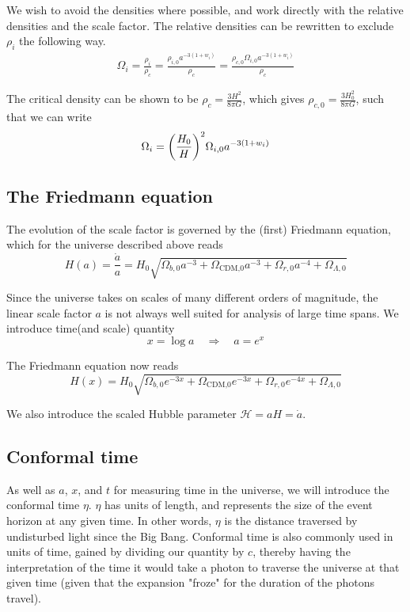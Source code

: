\documentclass[10pt, a4paper]{article}
\renewcommand{\exp}{e^}
\renewcommand{\exp}{e^}
\begin{document}
We wish to avoid the densities where possible, and work directly with the relative densities and the scale factor. The relative densities can be rewritten to exclude $\rho_i$ the following way.
\begin{align*}
    \Omega_{i} = \frac{\rho_i}{\rho_c} = \frac{\rho_{i,0}a^{-3(1+w_i)}}{\rho_c} = \frac{\rho_{c,0}\Omega_{i,0}a^{-3(1+w_i)}}{\rho_c}
\end{align*}

The critical density can be shown \cite{callin2006} to be $\rho_c = \frac{3H^2}{8\pi G}$, which gives $\rho_{c,0} = \frac{3H_0^2}{8\pi G}$, such that we can write
\begin{align}\label{eqn:Omegas}
    \Omega_{i} = \qty(\frac{H_0}{H})^2\Omega_{i,0}a^{-3(1+w_i)}
\end{align}


\subsection{The Friedmann equation}
The evolution of the scale factor is governed by the (first) Friedmann equation, which for the universe described above reads \cite{callin2006}
\begin{equation}
    H(a) = \frac{\dot{a}}{a} = H_0\sqrt{\Omega_{b,0} a^{-3} + \Omega_\text{{CDM},0}a^{-3} + \Omega_{r,0}a^{-4} + \Omega_{\Lambda,0}}
\end{equation}

Since the universe takes on scales of many different orders of magnitude, the linear scale factor $a$ is not always well suited for analysis of large time spans. We introduce time(and scale) quantity
\begin{equation}
    x = \log{a} \quad \Rightarrow \quad a = \exp{x}
\end{equation}

The Friedmann equation now reads
\begin{equation} \label{eqn:Friedmann}
    H(x) = H_0\sqrt{\Omega_{b,0} e^{-3x} + \Omega_\text{{CDM},0}e^{-3x} + \Omega_{r,0}e^{-4x} + \Omega_{\Lambda,0}}
\end{equation}

We also introduce the scaled Hubble parameter $\mathcal{H} = aH = \dot{a}$.


\subsection{Conformal time}
As well as $a$, $x$, and $t$ for measuring time in the universe, we will introduce the conformal time $\eta$. $\eta$ has units of length, and represents the size of the event horizon at any given time. In other words, $\eta$ is the distance traversed by undisturbed light since the Big Bang. Conformal time is also commonly used in units of time, gained by dividing our quantity by $c$, thereby having the interpretation of the time it would take a photon to traverse the universe at that given time (given that the expansion "froze" for the duration of the photons travel).
\end{document}
